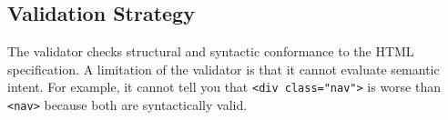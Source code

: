 \subsection{Validation Strategy}








The validator checks structural and syntactic conformance to the HTML specification. A limitation of the validator is that it cannot evaluate semantic intent. For example, it cannot tell you that \verb|<div class="nav">| is worse than \verb|<nav>| because both are syntactically valid.


